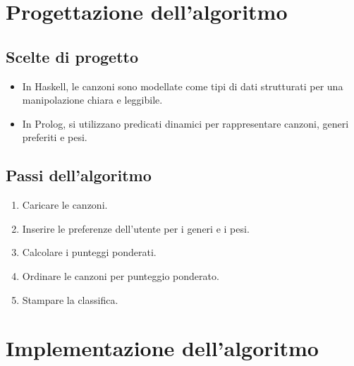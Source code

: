 \documentclass[a4paper,11pt]{article}
\begin{document}
\newpage
\section{Progettazione dell'algoritmo}
\subsection{Scelte di progetto}
\begin{itemize}
    \item In Haskell, le canzoni sono modellate come tipi di dati strutturati per una manipolazione chiara e leggibile.
    \item In Prolog, si utilizzano predicati dinamici per rappresentare canzoni, generi preferiti e pesi.
\end{itemize}

\subsection{Passi dell'algoritmo}
\begin{enumerate}
    \item Caricare le canzoni.
    \item Inserire le preferenze dell'utente per i generi e i pesi.
    \item Calcolare i punteggi ponderati.
    \item Ordinare le canzoni per punteggio ponderato.
    \item Stampare la classifica.
\end{enumerate}

\newpage
\section{Implementazione dell'algoritmo}
\end{document}
